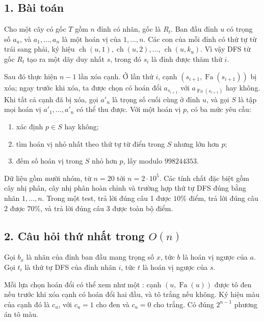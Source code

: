 \documentclass[11pt]{article}
\begin{document}
\subsection*{1. Bài toán}

Cho một cây có gốc \(T\) gồm \(n\) đỉnh có nhãn, gốc là \(R_t\). Ban đầu đỉnh
\(u\) có trọng số \(a_u\), và \(a_1,\ldots,a_n\) là một hoán vị của
\(1,\ldots,n\). Các con của mỗi đỉnh có thứ tự từ trái sang phải, ký hiệu
\(\operatorname{ch}(u,1),\operatorname{ch}(u,2),\ldots\),
\(\operatorname{ch}(u,k_u)\).
Vì vậy DFS từ gốc \(R_t\) tạo ra một dãy duy nhất \(s\), trong đó \(s_i\) là
đỉnh được thăm thứ \(i\).

Sau đó thực hiện \(n-1\) lần xóa cạnh. Ở lần thứ \(i\), cạnh
\((s_{i+1},\operatorname{Fa}(s_{i+1}))\) bị xóa; ngay trước khi xóa, ta được
chọn có hoán đổi \(a_{s_{i+1}}\) với
\(a_{\operatorname{Fa}(s_{i+1})}\) hay không. Khi tất cả cạnh đã bị xóa, gọi
\(a'_u\) là trọng số cuối cùng ở đỉnh \(u\), và gọi \(S\) là tập mọi hoán vị
\(a'_1,\ldots,a'_n\) có thể thu được. Với một hoán vị \(p\), có ba mức yêu cầu:

\begin{enumerate}
  \item xác định \(p\in S\) hay không;
  \item tìm hoán vị nhỏ nhất theo thứ tự từ điển trong \(S\) nhưng lớn hơn
  \(p\);
  \item đếm số hoán vị trong \(S\) nhỏ hơn \(p\), lấy modulo \(998244353\).
\end{enumerate}

Dữ liệu gồm mười nhóm, từ \(n=20\) tới \(n=2\cdot 10^5\). Các tính chất đặc biệt
gồm cây nhị phân, cây nhị phân hoàn chỉnh và trường hợp thứ tự DFS đúng bằng
nhãn \(1,\ldots,n\). Trong một test, trả lời đúng câu 1 được \(10\%\) điểm,
trả lời đúng câu 2 được \(70\%\), và trả lời đúng câu 3 được toàn bộ điểm.

\subsection*{2. Câu hỏi thứ nhất trong \(O(n)\)}

Gọi \(b_x\) là nhãn của đỉnh ban đầu mang trọng số \(x\), tức \(b\) là hoán vị
ngược của \(a\). Gọi \(t_i\) là thứ tự DFS của đỉnh nhãn \(i\), tức \(t\) là
hoán vị ngược của \(s\).

Mỗi lựa chọn hoán đổi có thể xem như một : cạnh
\((u,\operatorname{Fa}(u))\) được tô đen nếu trước khi xóa cạnh có hoán đổi hai
đầu, và tô trắng nếu không. Ký hiệu màu của cạnh đó là \(c_u\), với
\(c_u=1\) cho đen và \(c_u=0\) cho trắng. Có đúng \(2^{n-1}\) phương án tô màu.
\end{document}
